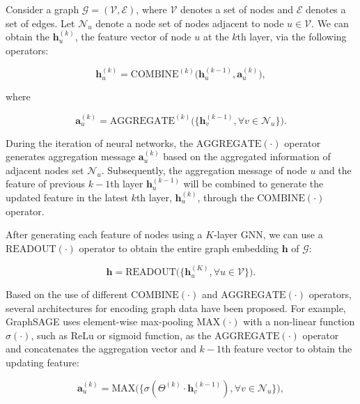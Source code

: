 Consider a graph $\mathcal{G} = (\mathcal{V},\mathcal{E})$, where $\mathcal{V}$ denotes a set of nodes and $\mathcal{E}$ denotes a set of edges. Let $\mathcal{N}_{u}$ denote a node set of nodes adjacent to node $u\in \mathcal{V}$. We can obtain the $\mathbf{h}_{u}^{(k)}$, the feature vector of node $u$ at the $k$th layer, via the following operators:

\begin{equation}
\mathbf{h}_{u}^{(k)}=\text{COMBINE}^{(k)}\Big(\mathbf{h}_{u}^{(k-1)},\mathbf{a}_{u}^{(k)}\Big),
\end{equation}

where

\begin{equation}
\mathbf{a}_{u}^{(k)}=\text{AGGREGATE}^{(k)}\Big(\{\mathbf{h}_{v}^{(k-1)}, \forall v\in\mathcal{N}_{u}\}\Big).
\end{equation}

During the iteration of neural networks, the $\text{AGGREGATE}(\cdot)$ operator generates aggregation message $\mathbf{a}_{u}^{(k)}$ based on the aggregated information of adjacent nodes set $\mathcal{N}_{u}$. Subsequently, the aggregation message of node $u$ and the feature of previous $k-1$th layer $\mathbf{h}_{u}^{(k-1)}$ will be combined to generate the updated feature in the latest $k$th layer, $\mathbf{h}_{u}^{(k)}$, through the $\text{COMBINE}(\cdot)$ operator.

After generating each feature of nodes using a $K$-layer GNN, we can use a $\text{READOUT}(\cdot)$ operator to obtain the entire graph embedding $\mathbf{h}$ of $\mathcal{G}$:

\begin{equation}
\mathbf{h}=\text{READOUT}\Big(\{\mathbf{h}_{u}^{(K)}, \forall u\in\mathcal{V}\}\Big).
\end{equation}

Based on the use of different $\text{COMBINE}(\cdot)$ and $\text{AGGREGATE}(\cdot)$ operators, several architectures for encoding graph data have been proposed. For example, GraphSAGE \cite{GraphSAGE} uses element-wise max-pooling $\text{MAX}(\cdot)$ with a non-linear function $\sigma(\cdot)$, such as ReLu or sigmoid function, as the $\text{AGGREGATE}(\cdot)$ operator and concatenates the aggregation vector and $k-1$th feature vector to obtain the updating feature:

\begin{equation}
\textbf{a}_{u}^{(k)}={\text{MAX}\Big(\Big\{\sigma(\Theta^{(k)}\cdot\textbf{h}_{v}^{(k-1)}),\forall v\in\mathcal{N}_{u}\Big\}\Big)},
\end{equation}

